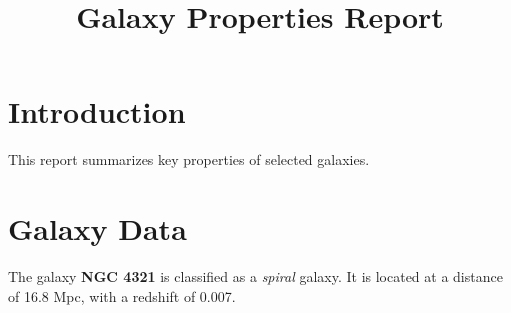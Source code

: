 \documentclass{article}
\title{Galaxy Properties Report}
\author{}
\date{}
\begin{document}
\maketitle

\section{Introduction}
This report summarizes key properties of selected galaxies.

\section{Galaxy Data}
The galaxy \textbf{NGC 4321} is classified as a \textit{spiral} galaxy. 
It is located at a distance of 16.8 Mpc, with a redshift of 0.007.
\end{document}
